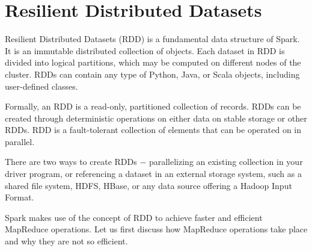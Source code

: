\section*{Resilient Distributed Datasets}
Resilient Distributed Datasets (RDD) is a fundamental data structure of Spark. It is an immutable distributed collection of objects. Each dataset in RDD is divided into logical partitions, which may be computed on different nodes of the cluster. RDDs can contain any type of Python, Java, or Scala objects, including user-defined classes.

Formally, an RDD is a read-only, partitioned collection of records. RDDs can be created through deterministic operations on either data on stable storage or other RDDs. RDD is a fault-tolerant collection of elements that can be operated on in parallel.

There are two ways to create RDDs − parallelizing an existing collection in your driver program, or referencing a dataset in an external storage system, such as a shared file system, HDFS, HBase, or any data source offering a Hadoop Input Format.

Spark makes use of the concept of RDD to achieve faster and efficient MapReduce operations. Let us first discuss how MapReduce operations take place and why they are not so efficient.


